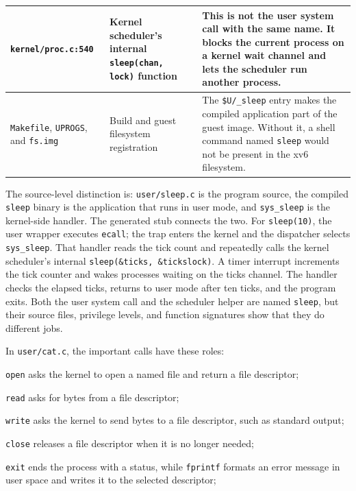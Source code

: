 \documentclass{assets/utmreport}
\begin{document}
\begin{longtable}{|p{3.0cm}|p{4.2cm}|p{7.2cm}|}
\hline
\texttt{kernel/}\newline\texttt{proc.c:540} & Kernel scheduler's internal \texttt{sleep(chan, lock)} function & This is not the user system call with the same name. It blocks the current process on a kernel wait channel and lets the scheduler run another process. \\
\hline
\texttt{Makefile}, \texttt{UPROGS}, and \texttt{fs.img} & Build and guest filesystem registration & The \texttt{\$U/\_sleep} entry makes the compiled application part of the guest image. Without it, a shell command named \texttt{sleep} would not be present in the xv6 filesystem. \\
\hline
\end{longtable}

The source-level distinction is: \texttt{user/sleep.c} is the program source, the compiled \texttt{sleep} binary is the application that runs in user mode, and \texttt{sys\_sleep} is the kernel-side handler. The generated stub connects the two. For \texttt{sleep(10)}, the user wrapper executes \texttt{ecall}; the trap enters the kernel and the dispatcher selects \texttt{sys\_sleep}. That handler reads the tick count and repeatedly calls the kernel scheduler's internal \texttt{sleep(\&ticks, \&tickslock)}. A timer interrupt increments the tick counter and wakes processes waiting on the ticks channel. The handler checks the elapsed ticks, returns to user mode after ten ticks, and the program exits. Both the user system call and the scheduler helper are named \texttt{sleep}, but their source files, privilege levels, and function signatures show that they do different jobs.

In \texttt{user/cat.c}, the important calls have these roles:
\begin{utmenumerate}
\item \texttt{open} asks the kernel to open a named file and return a file descriptor;
\item \texttt{read} asks for bytes from a file descriptor;
\item \texttt{write} asks the kernel to send bytes to a file descriptor, such as standard output;
\item \texttt{close} releases a file descriptor when it is no longer needed;
\item \texttt{exit} ends the process with a status, while \texttt{fprintf} formats an error message in user space and writes it to the selected descriptor;
\end{utmenumerate}
\end{document}
